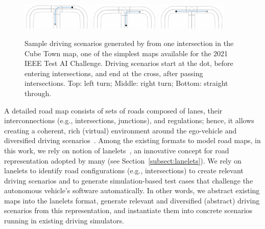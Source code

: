 \documentclass[conference]{IEEEtran}
\begin{document}

\begin{figure}[H]
  \centering
    \includegraphics[width=0.3\textwidth]{images/cubetown_1}
    \includegraphics[width=0.3\textwidth]{images/cubetown_2}
    \includegraphics[width=0.3\textwidth]{images/cubetown_3}
  \caption{Sample driving scenarios generated by \tool from one intersection in the Cube Town map, one of the simplest maps available for the 2021 IEEE Test AI Challenge. Driving scenarios start at the dot, before entering  intersections, and end at the cross, after passing  intersections.
  Top: left turn; Middle: right turn; Bottom: straight through.}
  \label{fig:samples-cubetown}
\end{figure}

A detailed road map consists of sets of roads composed of lanes, their interconnections (e.g., intersections, junctions), and regulations; hence, it allows creating a coherent, rich (virtual) environment around the ego-vehicle and diversified driving scenarios~\cite{althoff2018automatic,bender2014lanelets}. 
%
Among the existing formats to model road maps, in this work, we rely on notion of lanelets~\cite{bender2014lanelets}, an innovative concept for road representation adopted by many (see Section~\ref{subsect:lanelets}).
%
We rely on lanelets to identify road configurations (e.g., intersections) to create relevant driving scenarios and to generate simulation-based test cases that challenge the autonomous vehicle's software automatically. 
In other words, we abstract existing maps into the lanelets format, generate  relevant and diversified (abstract) driving scenarios from this representation, and instantiate them into concrete scenarios running in existing driving simulators.
\end{document}
